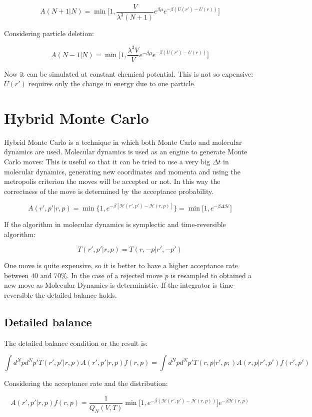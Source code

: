 	$$A(N+1|N) = \min\biggl[1, \frac{V}{\lambda^3(N+1)}e^{\beta\mu}e^{-\beta(U(r')-U(r))}\biggr]$$

	Considering particle deletion:

	$$A(N-1|N) = \min\biggl[1, \frac{\lambda^3V}{V}e^{-\beta\mu}e^{-\beta(U(r')-U(r))}\biggr]$$

	Now it can be simulated at constant chemical potential.
	This is not so expensive: $U(r')$ requires only the change in energy due to one particle.

\section{Hybrid Monte Carlo}
Hybrid Monte Carlo is a technique in which both Monte Carlo and molecular dynamics are used.
Molecular dynamics is used as an engine to generate Monte Carlo moves:
This is useful so that it can be tried to use a very big $\Delta t$ in molecular dynamics, generating new coordinates and momenta and using the metropolis criterion the moves will be accepted or not.
In this way the correctness of the move is determined by the acceptance probability.

$$A(r', p' | r, p) = \min\{1, e^{-\beta[\mathcal{H}(r', p')-\mathcal{H}(r, p)]}\} = \min\bigl[1,e^{-\beta\Delta\mathcal{H}}\bigr]$$

If the algorithm in molecular dynamics is symplectic and time-reversible algorithm:

$$T(r', p'|r, p) = T(r, -p|r', -p')$$

One move is quite expensive, so it is better to have a higher acceptance rate between $40$ and $70\%$.
In the case of a rejected move $p$ is resampled to obtained a new move as Molecular Dynamics is deterministic.
If the integrator is time-reversible the detailed balance holds.

	\subsection{Detailed balance}
	The detailed balance condition or the result is:

	$$\int d^Npd^Np' T(r',p'|r,p)A(r',p'|r,p)f(r,p) = \int d^Npd^Np'T(r, p|r',p;)A(r,p|r',p')f(r',p')$$

	Considering the acceptance rate and the distribution:

	$$A(r',p'|r,p)f(r,p) = \frac{1}{Q_N(V, T)}\min\bigl[1, e^{-\beta(\mathcal{H}(r', p')-\mathcal{H}(r,p))}\bigr]e^{-\beta\mathcal{H}(r, p)}$$

